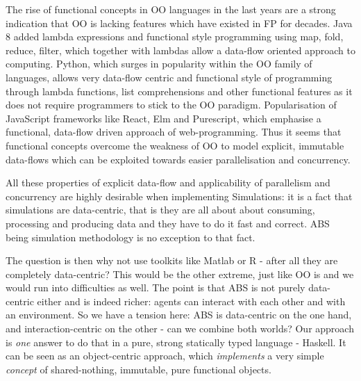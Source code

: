The rise of functional concepts in OO languages in the last years are a strong indication that OO is lacking features which have existed in FP for decades. Java 8 added lambda expressions and functional style programming using map, fold, reduce, filter, which together with lambdas allow a data-flow oriented approach to computing. Python, which surges in popularity within the OO family of languages, allows very data-flow centric and functional style of programming through lambda functions, list comprehensions and other functional features as it does not require programmers to stick to the OO paradigm. Popularisation of JavaScript frameworks like React, Elm and Purescript, which emphasise a functional, data-flow driven approach of web-programming. Thus it seems that functional concepts overcome the weakness of OO to model explicit, immutable data-flows which can be exploited towards easier parallelisation and concurrency.

All these properties of explicit data-flow and applicability of parallelism and concurrency are highly desirable when implementing Simulations: it is a fact that simulations are data-centric, that is they are all about about consuming, processing and producing data and they have to do it fast and correct. ABS being simulation methodology is no exception to that fact.

The question is then why not use toolkits like Matlab or R - after all they are completely data-centric? This would be the other extreme, just like OO is and we would run into difficulties as well. The point is that ABS is not purely data-centric either and is indeed richer: agents can interact with each other and with an environment. So we have a tension here: ABS is data-centric on the one hand, and interaction-centric on the other - can we combine both worlds? Our approach is \textit{one} answer to do that in a pure, strong statically typed language - Haskell. It can be seen as an object-centric approach, which \textit{implements} a very simple \textit{concept} of shared-nothing, immutable, pure functional objects.

